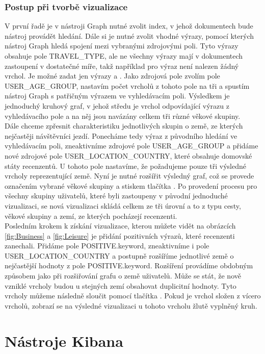 \documentclass[czech,BP]{thesiskiv}
\begin{document}
\subsubsection{Postup při tvorbě vizualizace}
V první řadě je v nástroji Graph nutné zvolit index, v jehož dokumentech bude nástroj provádět hledání. Dále si je nutné zvolit vhodné výrazy, pomocí kterých nástroj Graph hledá spojení mezi vybranými zdrojovými poli. Tyto výrazy obsahuje pole TRAVEL\_TYPE, ale ne všechny výrazy mají v dokumentech zastoupení v dostatečné míře, takž například pro výraz  není nalezen žádný vrchol. Je možné zadat jen výrazy  a . Jako zdrojová pole zvolím pole USER\_AGE\_GROUP, nastavím počet vrcholů z tohoto pole na tři a spustím nástroj Graph s patřičným výrazem ve vyhledávacím poli. Výsledkem je jednoduchý kruhový graf, v jehož středu je vrchol odpovídající výrazu z vyhledávacího pole a na něj jsou navázány celkem tři různé věkové skupiny.
\\
Dále chceme zpřesnit charakteristiku jednotlivých skupin o země, ze kterých nejčastěji návštěvníci jezdí. Ponecháme tedy výraz z původního hledání ve vyhledávacím poli, zneaktivníme zdrojové pole USER\_AGE\_GROUP a přidáme nové zdrojové pole USER\_LOCATION\_COUNTRY, které obsahuje domovské státy recenzentů. U tohoto pole nastavíme, že požadujeme pouze tři výsledné vrcholy reprezentující země. Nyní je nutné rozšířit výsledný graf, což se provede označením vybrané věkové skupiny a stiskem tlačítka . Po provedení procesu  pro všechny skupiny uživatelů, které byli zastoupeny v původní jednoduché vizualizaci, se nová vizualizaci skládá celkem ze tři úrovní a to z typu cesty, věkové skupiny a zemí, ze kterých pocházejí recenzenti.
\\
Posledním krokem k získání vizualizace, kterou můžete vidět na obrázcích \ref{fig:Business} a \ref{fig:Leisure} je přidání pozitivních výrazů, které recenzenti zanechali. Přidáme pole POSITIVE.keyword, zneaktivníme i pole USER\_LOCATION\_COUNTRY a postupně rozšíříme jednotlivé země o nejčastější hodnoty z pole POSITIVE.keyword. Rozšíření provádíme obdobným způsobem jako při rozšiřování grafu o země uživatelů. Může se stát, že nově vzniklé vrcholy budou u stejných zemí obsahovat duplicitní hodnoty. Tyto vrcholy můžeme následně sloučit pomocí tlačítka . Pokud je vrchol složen z vícero vrcholů, zobrazí se na výsledné vizualizaci u tohoto vrcholu žlutě vyplněný kruh.

\section{Nástroje Kibana}
\end{document}
